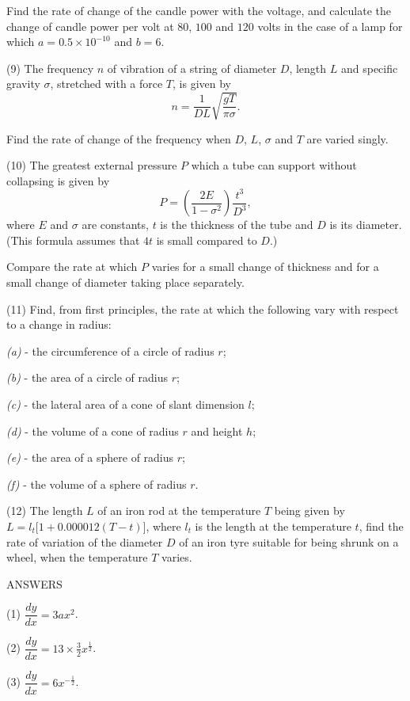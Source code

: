 \documentclass{ximera}
\begin{document}
{{{Find the rate of change of the candle power with
the voltage, and calculate the change of candle power
per volt at $80$, $100$ and $120$ volts in the case of a lamp
for which $a = 0.5 \times 10^{-10}$ and $b=6$.

(9) The frequency $n$ of vibration of a string of
diameter $D$, length $L$ and specific gravity $\sigma$, stretched
with a force $T$, is given by
\[
n = \dfrac{1}{DL} \sqrt{\dfrac{gT}{\pi\sigma}}.
\]

Find the rate of change of the frequency when $D$, $L$,
$\sigma$ and $T$ are varied singly.

(10) The greatest external pressure $P$ which a tube
can support without collapsing is given by
\[
  P = \left(\dfrac{2E}{1-\sigma^2}\right) \dfrac{t^3}{D^3},
\]
where $E$ and $\sigma$ are constants, $t$ is the thickness of the
tube and $D$ is its diameter. (This formula assumes
that $4t$ is small compared to $D$.)

Compare the rate at which $P$ varies for a small
change of thickness and for a small change of diameter
taking place separately.

(11) Find, from first principles, the rate at which
the following vary with respect to a change in
radius:

{\emph{(a)}} -  the circumference of a circle of radius $r$;

{\emph{(b)}} -  the area of a circle of radius $r$;

{\emph{(c)}} -  the lateral area of a cone of slant dimension $l$;

{\emph{(d)}} -  the volume of a cone of radius $r$ and height $h$;

{\emph{(e)}} -  the area of a sphere of radius $r$;

{\emph{(f)}} -  the volume of a sphere of radius $r$.


(12) The length $L$ of an iron rod at the temperature $T$
being given by $L = l_t\bigl[1 + 0.000012(T-t)\bigr]$, where $l_t$
is the length at the temperature $t$, find the rate of
variation of the diameter $D$ of an iron tyre suitable
for being shrunk on a wheel, when the temperature $T$
varies.

\begin{center} ANSWERS \end{center}

(1)  $\dfrac{dy}{dx} = 3ax^2$.

(2)  $\dfrac{dy}{dx} = 13 \times \frac{3}{2}x^{\frac{1}{2}}$.

(3)  $\dfrac{dy}{dx} = 6x^{-\frac{1}{2}}$.

}}}
\end{document}
